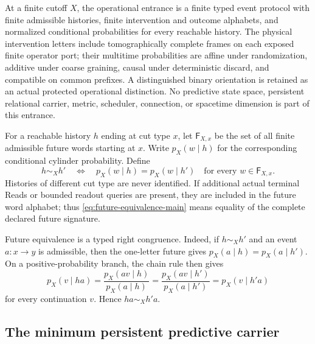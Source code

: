 \documentclass[11pt]{article}
\theoremstyle{definition}
\theoremstyle{remark}
\begin{document}
At a finite cutoff $X$, the operational entrance is a finite typed event
protocol with finite admissible histories, finite intervention and outcome
alphabets, and normalized conditional probabilities for every reachable
history.  The physical intervention letters include tomographically complete
frames on each exposed finite operator port; their multitime probabilities are
affine under randomization, additive under coarse graining, causal under
deterministic discard, and compatible on common prefixes.  A distinguished
binary orientation is retained as an actual protected operational distinction.
No predictive state space, persistent relational carrier, metric, scheduler,
connection, or spacetime dimension is part of this entrance.

For a reachable history $h$ ending at cut type $x$, let $\mathsf F_{X,x}$ be
the set of all finite admissible future words starting at $x$.  Write
$p_X(w\mid h)$ for the corresponding conditional cylinder probability.  Define
\begin{equation}
 h\sim_X h'
 \quad\Longleftrightarrow\quad
 p_X(w\mid h)=p_X(w\mid h')
 \quad\text{for every }w\in\mathsf F_{X,x}.
 \label{eq:future-equivalence-main}
\end{equation}
Histories of different cut type are never identified.  If additional actual
terminal Reads or bounded readout queries are present, they are included in
the future word alphabet; thus \eqref{eq:future-equivalence-main} means equality
of the complete declared future signature.

Future equivalence is a typed right congruence.  Indeed, if $h\sim_Xh'$ and an
event $a:x\to y$ is admissible, then the one-letter future gives
$p_X(a\mid h)=p_X(a\mid h')$.  On a positive-probability branch, the chain rule
then gives
\[
 p_X(v\mid ha)
 =\frac{p_X(av\mid h)}{p_X(a\mid h)}
 =\frac{p_X(av\mid h')}{p_X(a\mid h')}
 =p_X(v\mid h'a)
\]
for every continuation $v$.  Hence $ha\sim_Xh'a$.

\subsection{The minimum persistent predictive carrier}
\end{document}
